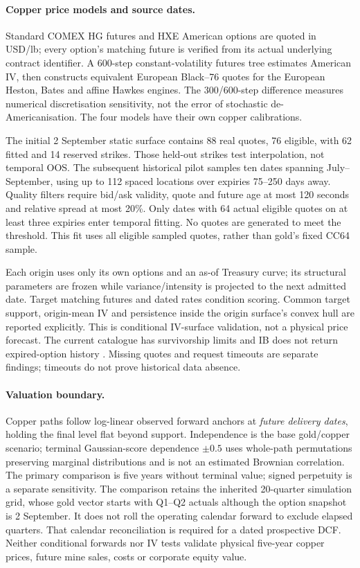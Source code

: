 \paragraph{Copper price models and source dates.}
Standard COMEX HG futures and HXE American options are quoted in USD/lb;
every option's matching future is verified from its actual underlying
contract identifier. A 600-step constant-volatility futures tree estimates
American IV, then constructs equivalent European Black--76 quotes for the
European Heston, Bates and affine Hawkes engines. The 300/600-step difference
measures numerical discretisation sensitivity, not the error of stochastic
de-Americanisation. The four models have their own copper calibrations.

The initial 2 September static surface contains 88 real quotes, 76 eligible,
with 62 fitted and 14 reserved strikes. Those held-out strikes test
interpolation, not temporal OOS. The subsequent historical pilot samples ten
dates spanning July--September, using up to 112 spaced locations over expiries
75--250 days away. Quality filters require bid/ask validity, quote and future
age at most 120 seconds and relative spread at most 20\%. Only dates with
64 actual eligible quotes on at least three expiries enter temporal fitting.
No quotes are generated to meet the threshold. This fit uses all eligible
sampled quotes, rather than gold's fixed CC64 sample.

Each origin uses only its own options and an as-of Treasury curve; its
structural parameters are frozen while variance/intensity is projected to
the next admitted date. Target matching futures and dated rates condition
scoring. Common target support, origin-mean IV and persistence inside the
origin surface's convex hull are reported explicitly. This is conditional
IV-surface validation, not a physical price forecast. The current catalogue
has survivorship limits and IB does not return expired-option history
\cite{ib-historical-limitations}. Missing quotes and request timeouts are
separate findings; timeouts do not prove historical data absence.

\paragraph{Valuation boundary.}
Copper paths follow log-linear observed forward anchors at \emph{future
delivery dates}, holding the final level flat beyond support. Independence
is the base gold/copper scenario; terminal Gaussian-score dependence
$\pm0.5$ uses whole-path permutations preserving marginal distributions and
is not an estimated Brownian correlation. The primary comparison is five
years without terminal value; signed perpetuity is a separate sensitivity.
The comparison retains the inherited 20-quarter simulation grid, whose gold
vector starts with Q1--Q2 actuals although the option snapshot is 2 September.
It does not roll the operating calendar forward to exclude elapsed quarters.
That calendar reconciliation is required for a dated prospective DCF.
Neither conditional forwards nor IV tests validate physical five-year copper
prices, future mine sales, costs or corporate equity value.

